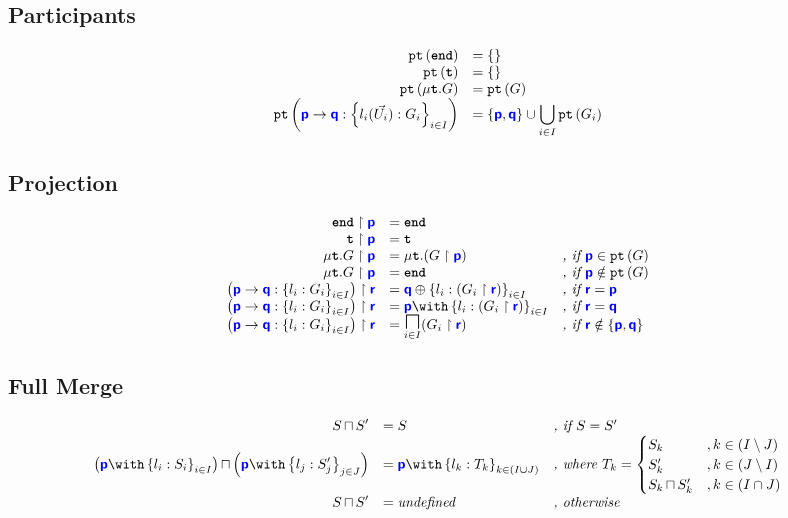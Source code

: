 \documentclass{article}
\begin{document}
\subsection{Participants}
\doublespacing
\[
\begin{array}{>{\displaystyle}r>{\displaystyle}l}
		\pt{\tyend} & = \left\{\right\} \\
		\pt{\tyrecvar} & = \left\{\right\} \\
		\pt{\tyrec{G}} & = \pt{G} \\
		\pt{\gcomm{p}{q}{l_i(\vec{U_i}): G_i}{i \in I}} & = \left\{\role{p},\role{q}\right\} \cup \bigcup_{i \in I}\pt{G_i} \\
\end{array}
\]
\singlespacing

\subsection{Projection}
\doublespacing
\[
\begin{array}{>{\displaystyle}r>{\displaystyle}l>{\displaystyle}l}
		\proj{\tyend}{p} & = \tyend & \\
		\proj{\tyrecvar}{p} & = \tyrecvar & \\
		\proj{\tyrec{G}}{p} & = \tyrec{(\proj{G}{p})} & \textit{, if }\role{p} \in \pt{G}\\
		\proj{\tyrec{G}}{p} & = \tyend & \textit{, if }\role{p} \notin \pt{G}\\
		\proj{\left(\gcomm{p}{q}{l_i: G_i}{i \in I}\right)}{r} & = \tysel{q}{l_i: (\proj{G_i}{r})}{i \in I} & \textit{, if }\role{r} = \role{p} \\
		\proj{\left(\gcomm{p}{q}{l_i: G_i}{i \in I}\right)}{r} & = \tybra{p}{l_i: (\proj{G_i}{r})}{i \in I} & \textit{, if }\role{r} = \role{q} \\
		\proj{\left(\gcomm{p}{q}{l_i: G_i}{i \in I}\right)}{r} & = \underset{i \in I}{\tyMERGEOP}{(\proj{G_i}{r})} & \textit{, if }\role{r} \notin \left\{\role{p},\role{q}\right\}
\end{array}
\]
\singlespacing

\subsection{Full Merge}
\doublespacing
\[
\begin{array}{>{\displaystyle}r>{\displaystyle}ll}
		\tymerge{S}{S'} & = S & \textit{, if $S = S'$} \\
		\tymerge{\left(\tybra{p}{l_i: S_i}{i \in I}\right)}{\left(\tybra{p}{l_j: S'_j}{j \in J}\right)} & = \tybra{p}{l_k: T_k}{k \in (I \cup J)} & \textit{, where } T_k = \begin{cases}
S_k & , k \in \left(I \setminus J\right) \\
S'_k & , k \in \left(J \setminus I\right) \\
\tymerge{S_k}{S'_k} & , k \in \left(I \cap J\right)
\end{cases} \\
		\tymerge{S}{S'} & = \textit{undefined} & \textit{, otherwise}\\
\end{array}
\]
\singlespacing
\end{document}
